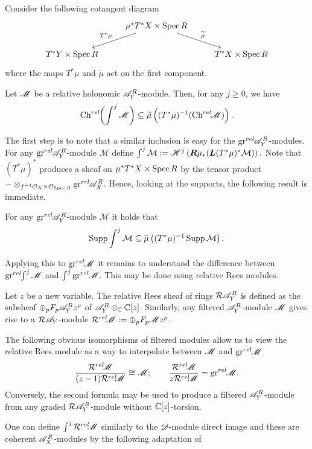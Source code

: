 Consider the following cotangent diagram 
$$
\begin{tikzcd}
    & \mu^* T^* X\times \Spec R \arrow[swap]{ld}{T^* \mu} \arrow{rd}{\widetilde{\mu}} & \\
    T^* Y\times \Spec R & & T^*X\times \Spec R
\end{tikzcd}
$$
where the maps $T^*\mu$ and $\widetilde{\mu}$ act on the first component. 
\begin{theorem}
    Let $\mathscr{M}$ be a relative holonomic $\mathscr{A}_Y^R$-module. Then, for any $j\geq 0$, we have  
    $$\operatorname{Ch}^{rel}\mkern-5mu\left(\int^j \mathscr{M} \right)\subseteq  \widetilde{\mu}\left((T^*\mu)^{-1}(\operatorname{Ch}^{rel}\mkern-5mu \mathscr{M}) \right).$$
\end{theorem}
The first step is to note that a similar inclusion is easy for the $\operatorname{gr}^{rel}\mkern-5mu \mathscr{A}_Y^R$-modules. For any $\operatorname{gr}^{rel}\mkern-5mu \mathscr{A}_Y^R$-module $\mathcal{M}$ define $\int^j \mathcal{M} :=  \mathscr{H}^j\left(\boldsymbol{R} \mu_* (\boldsymbol{L}(T^*\mu)^* \mathcal{M})\right).$ Note that $(T^*\mu)^*$ produces a sheaf on $\mu^* T^* X \times \operatorname{Spec} R$ by the tensor product  ${-}\otimes_{f^{-1}\mathcal{O}_X\times \mathcal{O}_{\operatorname{Spec} R}} \operatorname{gr}^{rel}\mkern-5mu \mathscr{A}_X^R$. Hence, looking at the supports, the following result is immediate. 
\begin{lemma}
    For any $\operatorname{gr}^{rel}\mkern-5mu\mathscr{A}_Y^R$-module $\mathcal{M}$ it holds that
    $$\operatorname{Supp} \int^j \mathcal{M}\subseteq \widetilde{\mu}\left((T^* \mu)^{-1} \operatorname{Supp} \mathcal{M}\right).$$
\end{lemma}
Applying this to $\operatorname{gr}^{rel}\mkern-5mu \mathscr{M}$ it remains to understand the difference between $\operatorname{gr}^{rel}\mkern-5mu\int^j \mathscr{M}$ and $\int^j \operatorname{gr}^{rel}\mkern-5mu \mathscr{M}$. This may be done using relative Rees modules.
\begin{definition}
    Let $z$ be a new variable. The relative Rees sheaf of rings $\mathcal{R}\mathscr{A}_Y^R$ is defined as the subsheaf $\oplus_p F_p \mathscr{A}_Y^R z^p $ of $\mathscr{A}_Y^R \otimes_{\mathbb{C}} \mathbb{C}[z]$. Similarly, any filtered $\mathscr{A}_Y^R$-module $\mathscr{M}$ gives rise to a $\mathcal{R}\mathscr{A}_Y$-module $\mathcal{R}^{rel}\mkern-5mu\mathscr{M} := \oplus_p F_p \mathscr{M} z^p$. 
\end{definition}
The following obvious isomorphisms of filtered modules allow us to view the relative Rees module as a way to interpolate between $\mathscr{M}$ and $\operatorname{gr}^{rel}\mkern-5mu\mathscr{M}$
$$\frac{\mathcal{R}^{rel}\mkern-5mu\mathscr{M}}{(z-1)\mathcal{R}^{rel}\mkern-5mu\mathscr{M}} \cong \mathscr{M}; \qquad \frac{\mathcal{R}^{rel}\mkern-5mu\mathscr{M}}{z\mathcal{R}^{rel}\mkern-5mu\mathscr{M}} = \operatorname{gr}^{rel}\mkern-5mu \mathscr{M}.$$
Conversely, the second formula may be used to produce a filtered $\mathscr{A}_Y^R$-module from any graded $\mathcal{R}\mathscr{A}_Y^R$-module without $\mathbb{C}[z]$-torsion.

One can define $\int^j \mathcal{R}^{rel}\mkern-5mu \mathscr{M}$ similarly to the $\mathscr{D}$-module direct image and these are coherent $\mathscr{A}_X^R$-modules by the following adaptation of 

